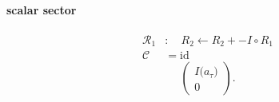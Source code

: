 \paragraph{scalar sector}
\[\begin{aligned}\mathcal R_{1}&:\quad R_2\leftarrow R_2+-I\circ R_1\\\mathcal C&=\mathrm{id}\end{aligned}\]
\[\begin{pmatrix}I\bigl(a_{\tau}\bigr)\\0\end{pmatrix}.\]

